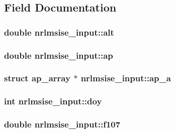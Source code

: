 \subsection{Field Documentation}
\hypertarget{structnrlmsise__input_a102b283f83c88896582614654330d4d7}{
\subsubsection[{alt}]{\setlength{\rightskip}{0pt plus 5cm}double nrlmsise\+\_\+input\+::alt}}\label{structnrlmsise__input_a102b283f83c88896582614654330d4d7}
\hypertarget{structnrlmsise__input_a65c8e469eba33cd0661c438ab2aedcb6}{
\subsubsection[{ap}]{\setlength{\rightskip}{0pt plus 5cm}double nrlmsise\+\_\+input\+::ap}}\label{structnrlmsise__input_a65c8e469eba33cd0661c438ab2aedcb6}
\hypertarget{structnrlmsise__input_a60e2d0c5b6b229eaead58be694110631}{
\subsubsection[{ap\+\_\+a}]{\setlength{\rightskip}{0pt plus 5cm}struct {\bf ap\+\_\+array} $\ast$ nrlmsise\+\_\+input\+::ap\+\_\+a}}\label{structnrlmsise__input_a60e2d0c5b6b229eaead58be694110631}
\hypertarget{structnrlmsise__input_a81329554920ba6f7180d427ab7a3b907}{
\subsubsection[{doy}]{\setlength{\rightskip}{0pt plus 5cm}int nrlmsise\+\_\+input\+::doy}}\label{structnrlmsise__input_a81329554920ba6f7180d427ab7a3b907}
\hypertarget{structnrlmsise__input_aaf339ba3dc1807f2a606215c6ec99502}{
\subsubsection[{f107}]{\setlength{\rightskip}{0pt plus 5cm}double nrlmsise\+\_\+input\+::f107}}\label{structnrlmsise__input_aaf339ba3dc1807f2a606215c6ec99502}
